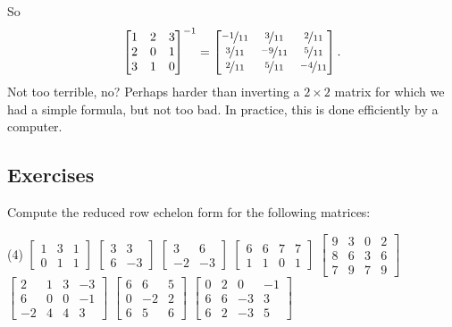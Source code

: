 So
\begin{equation*}
{\begin{bmatrix}
1 & 2 & 3 \\
2 & 0 & 1 \\
3 & 1 & 0
\end{bmatrix}}^{-1}
=
\begin{bmatrix}
\nicefrac{-1}{11} & \nicefrac{3}{11} & \nicefrac{2}{11} \\
\nicefrac{3}{11} & \nicefrac{-9}{11} & \nicefrac{5}{11} \\
\nicefrac{2}{11} & \nicefrac{5}{11} & \nicefrac{-4}{11}
\end{bmatrix} .
\end{equation*}
Not too terrible, no?  Perhaps harder than inverting a $2 \times 2$ matrix
for which we had a simple formula, but not too bad.  In practice, this
is done efficiently by a computer.

\subsection{Exercises}

\begin{samepage}
\begin{exercise}
Compute the reduced row echelon form for the following matrices:
\begin{tasks}(4)
\task
$\begin{bmatrix}
1 & 3 & 1 \\
0 & 1 & 1
\end{bmatrix}$
\task
$\begin{bmatrix}
3 & 3 \\
6 & -3
\end{bmatrix}$
\task
$\begin{bmatrix}
3 & 6 \\
-2 & -3
\end{bmatrix}$
\task
$\begin{bmatrix}
6 & 6 & 7 & 7 \\
1 & 1 & 0 & 1
\end{bmatrix}$
\task
$\begin{bmatrix}
9 & 3 & 0 & 2 \\
8 & 6 & 3 & 6 \\
7 & 9 & 7 & 9
\end{bmatrix}$
\task
$\begin{bmatrix}
2 & 1 & 3 & -3 \\
6 & 0 & 0 & -1 \\
-2 & 4 & 4 & 3
\end{bmatrix}$
\task
$\begin{bmatrix}
6 & 6 & 5 \\
0 & -2 & 2 \\
6 & 5 & 6
\end{bmatrix}$
\task
$\begin{bmatrix}
0 & 2 & 0 & -1 \\
6 & 6 & -3 & 3 \\
6 & 2 & -3 & 5
\end{bmatrix}$
\end{tasks}
\end{exercise}
\end{samepage}


